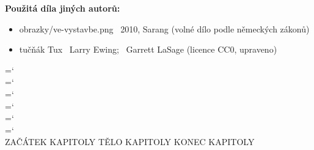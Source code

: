 \documentclass[10pt,final]{book}
\begin{document}
\noindent\textbf{Použitá díla jiných autorů:}
\begin{itemize}%
\item obrazky/ve-vystavbe.png \textcopyright~2010, Sarang (volné dílo podle německých zákonů)
\item tučňák Tux \textcopyright~Larry Ewing; \textcopyright~Garrett LaSage (licence CC0, upraveno)
\end{itemize}%
\vfill%
\clearpage%
%
\pagestyle{normalni}%
\renewcommand*{\contentsname}{OBSAH}%
\tableofcontents%
%
{%
    \selectfont\hyphenchar\font=`\\%
    \selectfont\hyphenchar\font=`\\%
    \selectfont\hyphenchar\font=`\\%
    \selectfont\hyphenchar\font=`\\%
    \selectfont\hyphenchar\font=`\\%
    \selectfont\hyphenchar\font=`\\%
}%
%
\clearpage%
\raggedbottom%
{{ZAČÁTEK KAPITOLY}}
{{TĚLO KAPITOLY}}
{{KONEC KAPITOLY}}
\end{document}
